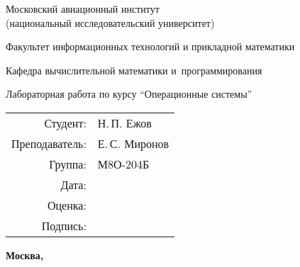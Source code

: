 \begin{titlepage}
\begin{center}
\bfseries

{\Large Московский авиационный институт\\ (национальный исследовательский университет)

}

\vspace{48pt}

{\large Факультет информационных технологий и прикладной математики
}

\vspace{36pt}

{\large Кафедра вычислительной математики и~программирования

}


\vspace{48pt}

Лабораторная работа  по курсу \enquote{Операционные системы}

\end{center}

\vspace{72pt}

\begin{flushright}
\begin{tabular}{rl}
Студент: & Н.\,П. Ежов \\
Преподаватель: & Е.\,С. Миронов\\
Группа: & М8О-204Б \\
Дата: & \\
Оценка: & \\
Подпись: & \\
\end{tabular}
\end{flushright}

\vfill

\begin{center}
\bfseries
Москва, \the\year
\end{center}
\end{titlepage}

\pagebreak
